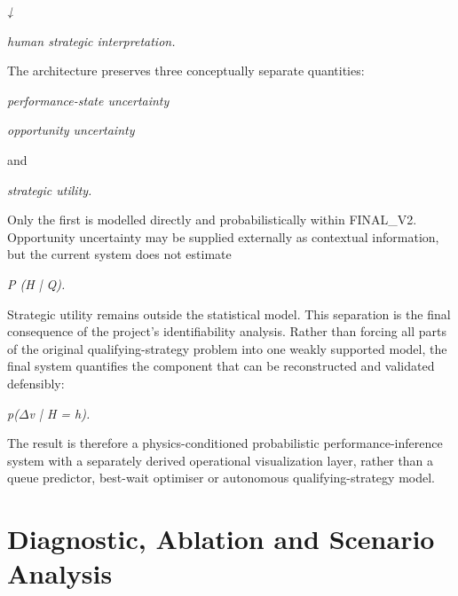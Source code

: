 \begin{center}\textit{↓}\end{center}

\begin{center}\textit{human strategic interpretation.}\end{center}

The architecture preserves three conceptually separate quantities:

\begin{center}\textit{performance-state uncertainty}\end{center}

\begin{center}\textit{opportunity uncertainty}\end{center}

and

\begin{center}\textit{strategic utility.}\end{center}

Only the first is modelled directly and probabilistically within FINAL\_V2. Opportunity uncertainty may be supplied externally as contextual information, but the current system does not estimate

\begin{center}\textit{P (H | Q).}\end{center}

Strategic utility remains outside the statistical model. This separation is the final consequence of the project's identifiability analysis. Rather than forcing all parts of the original qualifying-strategy problem into one weakly supported model, the final system quantifies the component that can be reconstructed and validated defensibly:

\begin{center}\textit{p(\ensuremath{\Delta}v | H = h).}\end{center}

The result is therefore a physics-conditioned probabilistic performance-inference system with a separately derived operational visualization layer, rather than a queue predictor, best-wait optimiser or autonomous qualifying-strategy model.

\section{Diagnostic, Ablation and Scenario Analysis}

